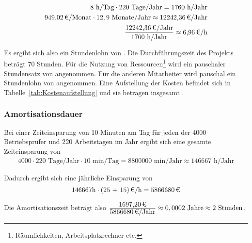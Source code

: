 \begin{eqnarray}
8 \mbox{ h/Tag} \cdot 220 \mbox{ Tage/Jahr} = 1760 \mbox{ h/Jahr}\\
\eur{949.02}\mbox{/Monat} \cdot 12,9 \mbox{ Monate/Jahr} \approx \eur{12242,36} \mbox{/Jahr}\\
\frac{\eur{12242,36} \mbox{/Jahr}}{1760 \mbox{ h/Jahr}} \approx \eur{6,96}\mbox{/h}
\end{eqnarray}

Es ergibt sich also ein Stundenlohn von . 
Die Durchführungszeit des Projekts beträgt 70 Stunden. Für die Nutzung von Ressourcen\footnote{Räumlichkeiten, Arbeitsplatzrechner etc.} wird 
ein pauschaler Stundensatz von  angenommen. Für die anderen Mitarbeiter wird pauschal ein Stundenlohn von  angenommen. 
Eine Aufstellung der Kosten befindet sich in Tabelle~\ref{tab:Kostenaufstellung} und sie betragen insgesamt .


\subsubsection{Amortisationsdauer}
\label{sec:Amortisationsdauer}

Bei einer Zeiteinsparung von 10 Minuten am Tag für jeden der 4000 Betriebsprüfer und 220 Arbeitstagen im Jahr ergibt sich eine gesamte Zeiteinsparung von 
\begin{eqnarray}
4000 \cdot 220 \mbox{ Tage/Jahr} \cdot 10 \mbox{ min/Tag} = 8800000 \mbox{ min/Jahr} \approx 146667 \mbox{ h/Jahr} 
\end{eqnarray}

Dadurch ergibt sich eine jährliche Einsparung von 
\begin{eqnarray}
146667 \mbox{h} \cdot \eur{(25 + 15)}{\mbox{/h}} = \eur{5866680}
\end{eqnarray}

Die Amortisationszeit beträgt also $\frac{\eur{1697,20}}{\eur{5866680}\mbox{/Jahr}} \approx 0,0002 \mbox{ Jahre} \approx 2 \mbox{ Stunden}$.


